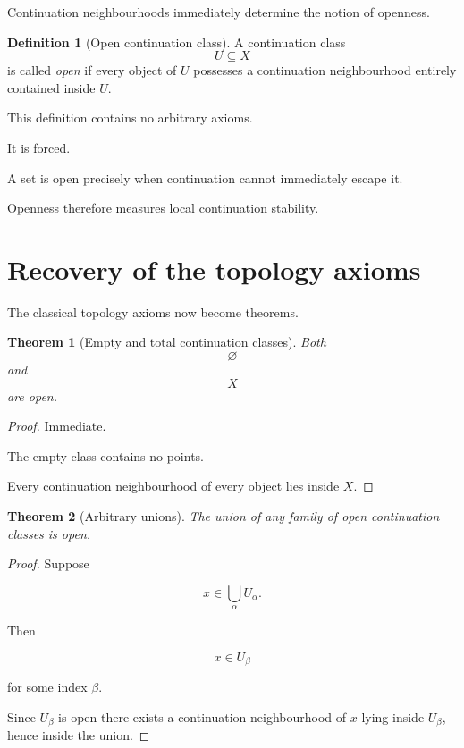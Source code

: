 \documentclass[13pt,openany]{book}
\theoremstyle{plain}
\newtheorem{theorem}{Theorem}[chapter]
\theoremstyle{definition}
\newtheorem{definition}{Definition}[chapter]
\begin{document}
Continuation neighbourhoods immediately determine the notion of openness.

\begin{definition}[Open continuation class]

A continuation class
\[
U\subseteq X
\]
is called \emph{open} if every object of $U$ possesses a continuation neighbourhood entirely contained inside $U$.
\end{definition}

This definition contains no arbitrary axioms.

It is forced.

A set is open precisely when continuation cannot immediately escape it.

Openness therefore measures local continuation stability.

\section{Recovery of the topology axioms}

The classical topology axioms now become theorems.

\begin{theorem}[Empty and total continuation classes]

Both
\[
\varnothing
\]
and
\[
X
\]
are open.
\end{theorem}

\begin{proof}

Immediate.

The empty class contains no points.

Every continuation neighbourhood of every object lies inside $X$.

\end{proof}

\begin{theorem}[Arbitrary unions]

The union of any family of open continuation classes is open.
\end{theorem}

\begin{proof}

Suppose

\[
x\in\bigcup_{\alpha}U_\alpha .
\]

Then

\[
x\in U_\beta
\]

for some index $\beta$.

Since $U_\beta$ is open there exists a continuation neighbourhood of $x$ lying inside $U_\beta$, hence inside the union.

\end{proof}
\end{document}
